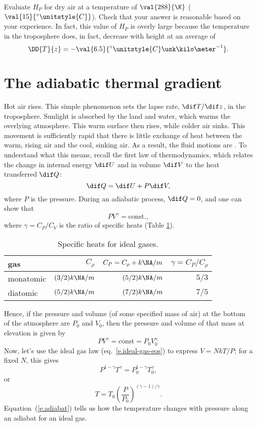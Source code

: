 \begin{exercisebox}
Evaluate $H_{P}$ for dry air at a temperature of $\val{288}{\K}$ ($\val{15}{^{\circ}\unitstyle{C}}$).  Check that your answer is reasonable based on your experience.  In fact, this value of $H_{P}$ is overly large because the temperature in the troposphere does, in fact, decrease with height at an average  of
\[
	\DD{T}{z} = -\val{6.5}{^{\circ}\unitstyle{C}\usk\kilo\meter^{-1}}.
\]
\end{exercisebox}

\section{The adiabatic thermal gradient}\label{s.adiabatic-gradient}
Hot air rises. This simple phenomenon sets the lapse rate, $\dif T/\dif z$, in the troposphere. Sunlight is absorbed by the land and water, which warms the overlying atmosphere. This warm surface then rises, while colder air sinks. This movement is sufficiently rapid that there is little exchange of heat between the warm, rising air and the cool, sinking air. As a result, the fluid motions are . To understand what this means, recall the first law of thermodynamics\cite{Fermi1956Thermodynamics}, which relates the change in internal energy $\dif U$ and in volume $\dif V$ to the heat transferred $\dif Q$:
\begin{equation}\label{e.first-law-thermo}
	\dif Q = \dif U + P\dif V,
\end{equation}
where $P$ is the pressure. During an adiabatic process, $\dif Q = 0$, and one can show that
\[
	PV^{\gamma} = \mathrm{const.},
\]
where $\gamma = C_{P}/C_{V}$ is the ratio of specific heats (Table \ref{t.specific-heat}).
\begin{table}
\caption{Specific heats for ideal gases.\label{t.specific-heat}}
\begin{tabular}{lrrr}
gas & $C_{\rho}$ & $C_{P}=C_{\rho}+k\NA/m$ & $\gamma = C_{P}/C_{\rho}$\\
\hline
monatomic & $(3/2) k\NA/m$ & $(5/2)k\NA/m$ & $5/3$\\
diatomic & $(5/2) k\NA/m$ & $(7/2)k\NA/m$ & $7/5$\\
\end{tabular}
\end{table}
Hence, if the pressure and volume (of some specified mass of air) at the bottom of the atmosphere are $P_{0}$ and $V_{0}$, then the pressure and volume of that mass at elevation is given by
\[
	PV^{\gamma} = \mathrm{const} =  P_{0}V_{0}^{\gamma.}
\]
Now, let's use the ideal gas law (eq.~\ref{e.ideal-gas-eos}) to express $V = NkT/P$; for a fixed $N$, this gives
\[
	P^{1-\gamma}T^{\gamma} = P_{0}^{1-\gamma}T_{0}^{\gamma},
\]
or
\begin{equation}\label{e.adiabat}
 T = T_{0}\left(\frac{P}{P_{0}}\right)^{(\gamma-1)/\gamma}.
\end{equation}
Equation~(\ref{e.adiabat}) tells us how the temperature changes with pressure along an adiabat for an ideal gas.

